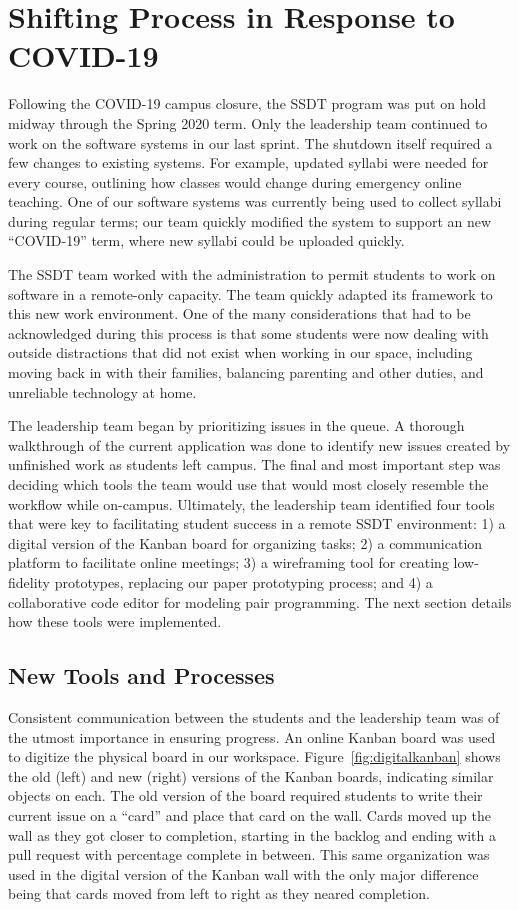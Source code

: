 \section{Shifting Process in Response to COVID-19}

Following the COVID-19 campus closure, the SSDT program was put on hold midway through the Spring 2020 term. Only the leadership team continued to work on the software systems in our last sprint. The shutdown itself required a few changes to existing systems. For example, updated syllabi were needed for every course, outlining how classes would change during emergency online teaching. One of our software systems was currently being used to collect syllabi during regular terms; our team quickly modified the system to support an new ``COVID-19'' term, where new syllabi could be uploaded quickly.

The SSDT team worked with the administration to permit students to work on software in a remote-only capacity. The team quickly adapted its framework to this new work environment. One of the many considerations that had to be acknowledged during this process is that some students were now dealing with outside distractions that did not exist when working in our space, including moving back in with their families, balancing parenting and other duties, and unreliable technology at home.

The leadership team began by prioritizing issues in the queue. A thorough walkthrough of the current application was done to identify new issues created by unfinished work as students left campus. The final and most important step was deciding which tools the team would use that would most closely resemble the workflow while on-campus. Ultimately, the leadership team identified four tools that were key to facilitating student success in a remote SSDT environment: 1) a digital version of the Kanban board for organizing tasks; 2) a communication platform to facilitate online meetings; 3) a wireframing tool for creating low-fidelity prototypes, replacing our paper prototyping process; and 4) a collaborative code editor for modeling pair programming. The next section details how these tools were implemented.

\subsection{New Tools and Processes}
Consistent communication between the students and the leadership team was of the utmost importance in ensuring progress. An online Kanban board was used to digitize the physical board in our workspace. Figure~\ref{fig:digitalkanban} shows the old (left) and new (right) versions of the Kanban boards, indicating similar objects on each. The old version of the board required students to write their current issue on a ``card'' and place that card on the wall. Cards moved up the wall as they got closer to completion, starting in the backlog and ending with a pull request with percentage complete in between. This same organization was used in the digital version of the Kanban wall with the only major difference being that cards moved from left to right as they neared completion.

